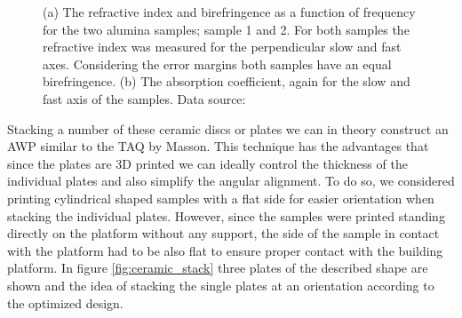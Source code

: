 \begin{figure}[ht]
\begin{subfigure}[b]{.5\linewidth}
    \end{subfigure}
    \caption{(a) The refractive index and birefringence as a function of frequency for the two alumina samples; sample 1 and 2. For both samples the refractive index was measured for the perpendicular slow and fast axes. Considering the error margins both samples have an equal birefringence. (b) The absorption coefficient, again for the slow and fast axis of the samples. Data source: \cite{Ornik2021}}\label{fig:ri_abs}
\end{figure}

Stacking a number of these ceramic discs or plates we can in theory construct an AWP similar to the TAQ by Masson. This technique has the advantages that since the plates are 3D printed we can ideally control the thickness of the individual plates and also simplify the angular alignment. To do so, we considered printing cylindrical shaped samples with a flat side for easier orientation when stacking the individual plates. However, since the samples were printed standing directly on the platform without any support, the side of the sample in contact with the platform had to be also flat to ensure proper contact with the building platform. In figure \ref{fig:ceramic_stack} three plates of the described shape are shown and the idea of stacking the single plates at an orientation according to the optimized design.

